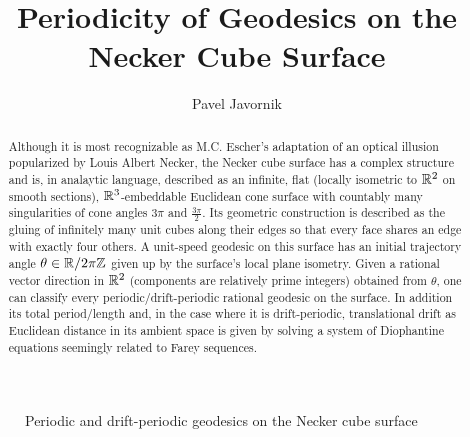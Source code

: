 \documentclass[]{article}
\begin{document}
\newtheorem{thm}{Theorem}[]
\newtheorem{Def}{Definition}[]
\newtheorem*{thm*}{Theorem}
\newtheorem*{def*}{Definition}
\newtheorem{lem}{Lemma}
\newtheorem*{rem}{Remark}
\newcommand{\shiftleft}[2]{\makebox[0pt][r]{\makebox[#1][l]{#2}}}
\newtheorem*{conj}{Conjecture}
\newtheorem{cor}{Corollary}[]

\newcommand{\compav}[1]{\textbf{\textcolor{blue}{#1}}}
\newcommand{\compat}[1]{\textbf{\textcolor{red}{#1}}}
\graphicspath{{images/}}


\setlength{\topmargin}{1in} %
\setlength{\oddsidemargin}{\topmargin} %

\setlength{\textheight}{11in} \setlength{\textwidth}{8.5in}
\setlength{\hoffset}{-1in} \setlength{\voffset}{-1in} \setlength{\evensidemargin}{\oddsidemargin} \addtolength{\textheight}{-2 \topmargin}\addtolength{\textwidth}{-2\oddsidemargin}
\setlength{\headheight}{0pt} \setlength{\headsep}{20pt} \setlength{\footskip}{20pt}
\addtolength{\textheight}{-\footskip} \addtolength{\textheight}{-\headheight} \addtolength{\textheight}{-\headsep}


\title{Periodicity of Geodesics on the Necker Cube Surface}
\author{Pavel Javornik}

\maketitle

%

\begin{abstract}
\noindent Although it is most recognizable as M.C. Escher's adaptation of an optical illusion popularized by Louis Albert Necker, the Necker cube surface has a complex structure and is, in analaytic language, described as an infinite, flat (locally isometric to $\mathbb{R}^2$ on smooth sections), $\mathbb{R}^3$-embeddable Euclidean cone surface with countably many singularities of cone angles $3\pi$ and $\frac{3\pi}{2}$. Its geometric construction is described as the gluing of infinitely many unit cubes along their edges so that every face shares an edge with exactly four others. A unit-speed geodesic on this surface has an initial trajectory angle $\theta\in\mathbb{R}/2\pi\mathbb{Z}$ given up by the surface's local plane isometry. Given a rational vector direction in $\mathbb{R}^2$ (components are relatively prime integers) obtained from $\theta$, one can classify every periodic/drift-periodic rational geodesic on the surface. In addition its total period/length and, in the case where it is drift-periodic, translational drift as Euclidean distance in its ambient space is given by solving a system of Diophantine equations seemingly related to Farey sequences.
\end{abstract}
\begin{figure}[H]
\centering

\label{fig:front}
\caption{Periodic and drift-periodic geodesics on the Necker cube surface}
\end{figure}
\end{document}
